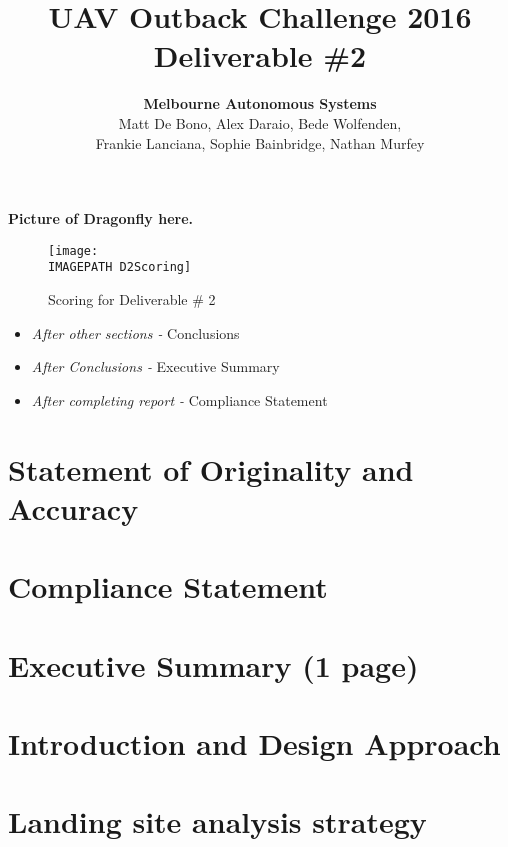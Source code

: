 \documentclass{article}
\title{UAV Outback Challenge 2016\\ Deliverable \#2\\}
\author{
	\textbf{Melbourne Autonomous Systems}\\
	Matt De Bono,
	Alex Daraio,
	Bede Wolfenden,\\
	Frankie Lanciana,
	Sophie Bainbridge,
	Nathan Murfey}
\newcommand{\IMAGEPATH}{../Images/}
\begin{document}
\maketitle

\textbf{Picture of Dragonfly here.}

\clearpage

\tableofcontents

\clearpage

\begin{figure}[h]
	\centering
	\texttt{[image: \\IMAGEPATH D2Scoring]}
	\caption{Scoring for Deliverable \# 2}
	\label{fig:D2Scoring}
\end{figure}

\begin{itemize}
	\item \textit{After other sections -} Conclusions
	\item \textit{After Conclusions -} Executive Summary
	\item \textit{After completing report -} Compliance Statement
\end{itemize}

\clearpage

\section{Statement of Originality and Accuracy}


\clearpage

\section{Compliance Statement}
\begin{figure}
	
\end{figure}


\clearpage
\section{Executive Summary (1 page)}


\clearpage
\section{Introduction and Design Approach}


\clearpage
\section{Landing site analysis strategy}

\end{document}
